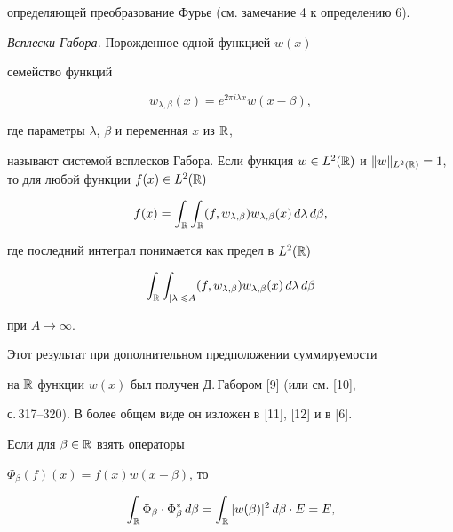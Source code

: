 определяющей преобразование Фурье (см. замечание 4 к определению 6).


\medskip





{\it Всплески Габора.} Порожденное одной функцией $w(x)$


семейство функций


$$


w_{\lambda, \beta}(x)=e^{2\pi i\lambda x} w(x-\beta),


$$


где параметры $\lambda$, $\beta$ и переменная $x$ из ${\Bbb R}$,


называют системой всплесков Габора. Если функция $w\in L^2 ({\Bbb


R})$ и $\|w\|_{L^2 ({\Bbb R})}=1$, то для любой функции $f(x)\in


L^2 ({\Bbb R})$


$$


f(x)=\int_{\Bbb R}\int_{\Bbb R} (f, w_{\lambda,


\beta})w_{\lambda, \beta}(x)\,d\lambda\,d\beta,


$$


где последний интеграл понимается как предел в $L^2(\Bbb R)$


$$


\int_{\Bbb R}\int_{|\lambda|\leqslant A} (f, w_{\lambda,


\beta})w_{\lambda, \beta}(x)\,d\lambda\,d\beta


$$


при $A\to\infty$.





Этот результат при дополнительном предположении суммируемости


на ${\Bbb R}$ функции $w(x)$ был получен Д.\,Габором [9] (или см. [10],


с.\,317--320). В более общем виде он изложен в [11], [12] и в [6].





Если для $\beta\in\Bbb R$ взять операторы


$\Phi_\beta(f)(x)=f(x)w(x-\beta)$, то


$$


\int_{\Bbb R}\Phi_\beta\cdot\Phi_\beta^*\,d\beta=\int_{\Bbb


R}|w(\beta)|^2\,d\beta\cdot E=E,


$$


